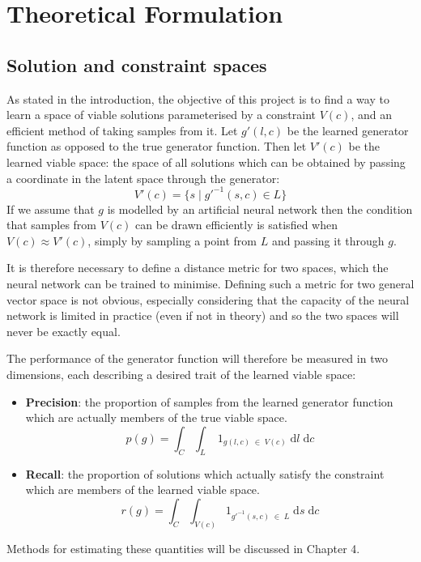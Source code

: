 \documentclass[../../main.tex]{subfiles}
\begin{document}
\chapter{Theoretical Formulation} \label{chapter:theoreticalFormulation}

\section{Solution and constraint spaces} \label{section:solutionAndConstraintSpaces}

As stated in the introduction, the objective of this project is to find a way to learn a space of viable solutions parameterised by a constraint $V(c)$, and an efficient method of taking samples from it.
Let $g'(l,c)$ be the learned generator function as opposed to the true generator function.
Then let $V'(c)$ be the learned viable space: the space of all solutions which can be obtained by passing a coordinate in the latent space through the generator:
\begin{equation}
	V'(c)=\{s\;|\;g'^{-1}(s,c)\in L\}
\end{equation}
If we assume that $g$ is modelled by an artificial neural network then the condition that samples from $V(c)$ can be drawn efficiently is satisfied when $V(c)\approx V'(c)$, simply by sampling a point from $L$ and passing it through $g$.

It is therefore necessary to define a distance metric for two spaces, which the neural network can be trained to minimise.
Defining such a metric for two general vector space is not obvious, especially considering that the capacity of the neural network is limited in practice (even if not in theory) and so the two spaces will never be exactly equal.

The performance of the generator function will therefore be measured in two dimensions, each describing a desired trait of the learned viable space:
\begin{itemize}
    \item[] \textbf{Precision}: the proportion of samples from the learned generator function which are actually members of the true viable space.
	\begin{equation}
		p(g)=\int_{C}\int_{L}\;1_{g(l, c)\;\in\;V(c)}\;\mathrm{d}l\;\mathrm{d}c
	\end{equation}
    \item[] \textbf{Recall}: the proportion of solutions which actually satisfy the constraint which are members of the learned viable space.
	\begin{equation}
		r(g)=\int_{C}\int_{V(c)}1_{g'^{-1}(s,c)\;\in\;L}\;\mathrm{d}s\;\mathrm{d}c
	\end{equation}
\end{itemize}
Methods for estimating these quantities will be discussed in Chapter 4.
\end{document}
